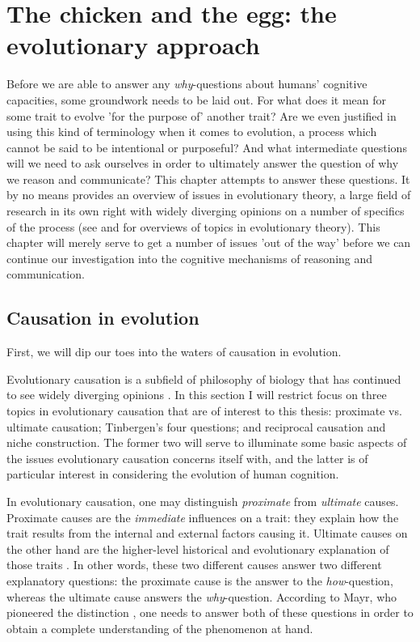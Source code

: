 \chapter{The chicken and the egg: the evolutionary approach}
\label{ch:evolution}

Before we are able to answer any \emph{why}-questions about humans' cognitive capacities, some groundwork needs to be laid out. For what does it mean for some trait to evolve 'for the purpose of' another trait? Are we even justified in using this kind of terminology when it comes to evolution, a process which cannot be said to be intentional or purposeful? And what intermediate questions will we need to ask ourselves in order to ultimately answer the question of why we reason and communicate?
This chapter attempts to answer these questions. It by no means provides an overview of issues in evolutionary theory, a large field of research in its own right with widely diverging opinions on a number of specifics of the process (see \citet{Ariew02} and \citet{UllerLaland19} for overviews of topics in evolutionary theory).
This chapter will merely serve to get a number of issues 'out of the way' before we can continue our investigation into the cognitive mechanisms of reasoning and communication.

\section{Causation in evolution}
\label{sec:causation-evolution}

First, we will dip our toes into the waters of causation in evolution.

Evolutionary causation is a subfield of philosophy of biology that has continued to see widely diverging opinions \citep{Baedke2021, UllerLaland19}. In this section I will restrict focus on three topics in evolutionary causation that are of interest to this thesis: proximate vs. ultimate causation; Tinbergen's four questions; and reciprocal causation and niche construction.
The former two will serve to illuminate some basic aspects of the issues evolutionary causation concerns itself with, and the latter is of particular interest in considering the evolution of human cognition.

In evolutionary causation, one may distinguish \emph{proximate} from \emph{ultimate} causes.
Proximate causes are the \emph{immediate} influences on a trait: they explain how the trait results from the internal and external factors causing it.
Ultimate causes on the other hand are the higher-level historical and evolutionary explanation of those traits \citep{Mayr61}. In other words, these two different causes answer two different explanatory questions: the proximate cause is the answer to the \emph{how}-question, whereas the ultimate cause answers the \emph{why}-question. According to Mayr, who pioneered the distinction \citep{Laland13}, one needs to answer both of these questions in order to obtain a complete understanding of the phenomenon at hand.

